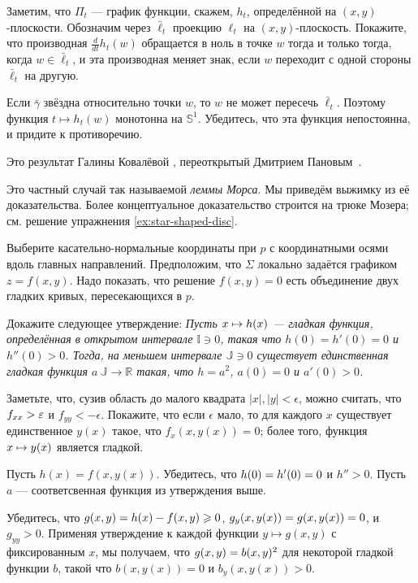 Заметим, что $\Pi_t$ --- график функции, скажем, $h_t$, определённой на $(x, y)$-плоскости.
Обозначим через $\bar\ell_t$ проекцию $\ell_t$ на $(x, y)$-плоскость.
Покажите, что производная $\tfrac{d}{dt}h_t(w)$ обращается в ноль в точке $w$ тогда и только тогда, когда $w\in \bar\ell_t$, и эта производная меняет знак, если $w$ переходит с одной стороны $\bar\ell_t$ на другую.

Если $\bar\gamma$ звёздна относительно точки $w$, то $w$ не может пересечь $\bar\ell_t$.
Поэтому функция $t\mapsto h_t(w)$ монотонна на $\mathbb{S}^1$.
Убедитесь, что эта функция непостоянна, и придите к противоречию.

Это результат Галины Ковалёвой \cite{kovaleva}, переоткрытый Дмитрием Пановым~\cite{panov-curves}.

Это частный случай так называемой \emph{леммы Морса}.
Мы приведём выжимку из её доказательства.
Более концептуальное доказательство \cite{abraham-marsden-ratiu} строится на трюке Мозера; см. решение упражнения \ref{ex:star-shaped-disc}.

\medskip

Выберите касательно-нормальные координаты при $p$ с координатными осями вдоль главных направлений.
Предположим, что $\Sigma$ локально задаётся графиком $z=f(x,y)$.
Надо показать, что решение $f(x,y)=0$ есть объединение двух гладких кривых, пересекающихся в $p$.

Докажите следующее утверждение:
\textit{Пусть $x\z\mapsto h(x)$ --- гладкая функция, определённая в открытом интервале $\mathbb{I}\ni0$, такая что $h(0)=h'(0)=0$ и $h''(0)>0$.
Тогда, на меньшем интервале $\mathbb{J}\ni0$ существует единственная гладкая функция $a\:\mathbb{J}\to\mathbb{R}$ такая, что $h=a^2$, $a(0)=0$ и $a'(0)> 0$.}

Заметьте, что, сузив область до малого квадрата  $|x|,|y|<\epsilon$, можно считать, что $f_{xx}\z>\epsilon$ и $f_{yy}<-\epsilon$.
Покажите, что если $\epsilon$ мало, то для каждого $x$ существует единственное $y(x)$ такое, что $f_x(x,y(x))=0$; более того, функция $x\z\mapsto y(x)$ является гладкой.

Пусть $h(x)=f(x,y(x))$.
Убедитесь, что $h(0)\z=h'(0)=0$ и $h''>0$.
Пусть $a$ --- соответсвенная функция из утверждения выше.

Убедитесь, что $g(x,y)=h(x)-f(x,y)\z\ge 0$, $g_y(x,y(x))\z=g(x,y(x))\z=0$, и $g_{yy}>0$.
Применяя утверждение к каждой функции $y\mapsto g(x,y)$ с фиксированным $x$, мы получаем, что $g(x,y)\z=b(x,y)^2$ для некоторой гладкой функции $b$, такой что
$b(x,y(x))=0$ и $b_y(x,y(x))>0$.

